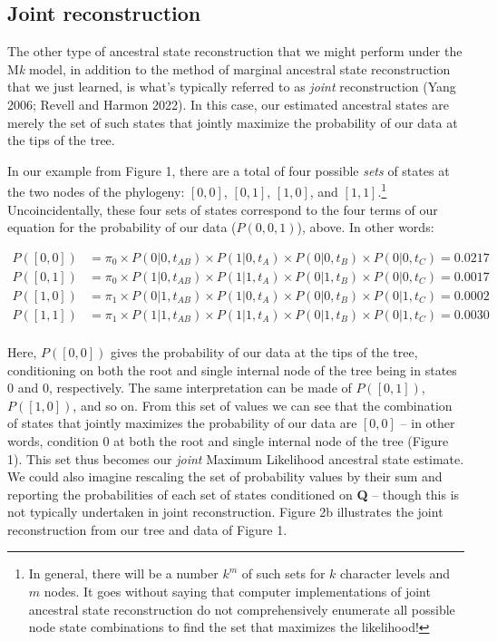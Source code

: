 \documentclass{article}
\begin{document}
\subsection{Joint reconstruction}\label{joint-reconstruction}

The other type of ancestral state reconstruction that we might perform under the M\emph{k} model, in addition to the method of marginal ancestral state reconstruction that we just learned, is what's typically referred to as \emph{joint} reconstruction (Yang 2006; Revell and Harmon 2022). In this case, our estimated ancestral states are merely the set of such states that jointly maximize the probability of our data at the tips of the tree.

In our example from Figure 1, there are a total of four possible \emph{sets} of states at the two nodes of the phylogeny: \([0,0]\), \([0,1]\), \([1,0]\), and \([1,1]\).\footnote{In general, there will be a number $k^m$ of such sets for $k$ character levels and $m$ nodes. It goes without saying that computer implementations of joint ancestral state reconstruction do not comprehensively enumerate all possible node state combinations to find the set that maximizes the likelihood!} Uncoincidentally, these four sets of states correspond to the four terms of our equation for the probability of our data (\(P(0,0,1)\)), above. In other words:

\[\begin{aligned}
P([0,0]) & = \pi_{0} \times P(0|0,t_{AB}) \times P(1|0,t_{A}) \times P(0|0,t_{B}) \times P(0|0,t_{C}) = 0.0217\\ 
P([0,1]) & = \pi_{0} \times P(1|0,t_{AB}) \times P(1|1,t_{A}) \times P(0|1,t_{B}) \times P(0|0,t_{C}) = 0.0017\\
P([1,0]) & = \pi_{1} \times P(0|1,t_{AB}) \times P(1|0,t_{A}) \times P(0|0,t_{B}) \times P(0|1,t_{C}) = 0.0002\\
P([1,1]) & = \pi_{1} \times P(1|1,t_{AB}) \times P(1|1,t_{A}) \times P(0|1,t_{B}) \times P(0|1,t_{C}) = 0.0030\\
\end{aligned}\]

Here, \(P([0,0])\) gives the probability of our data at the tips of the tree, conditioning on both the root and single internal node of the tree being in states 0 and 0, respectively. The same interpretation can be made of \(P([0,1])\), \(P([1,0])\), and so on. From this set of values we can see that the combination of states that jointly maximizes the probability of our data are \([0,0]\) -- in other words, condition 0 at both the root and single internal node of the tree (Figure 1). This set thus becomes our \emph{joint} Maximum Likelihood ancestral state estimate. We could also imagine rescaling the set of probability values by their sum and reporting the probabilities of each set of states conditioned on \textbf{Q} -- though this is not typically undertaken in joint reconstruction. Figure 2b illustrates the joint reconstruction from our tree and data of Figure 1.
\end{document}

